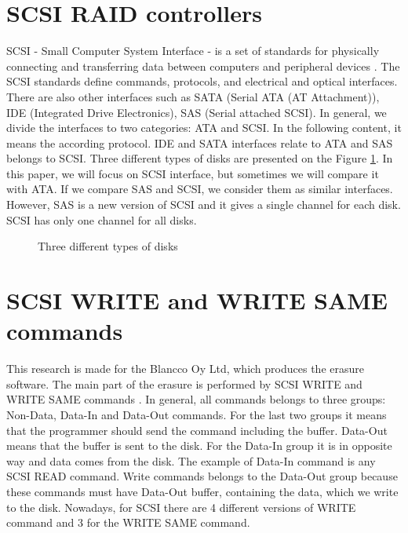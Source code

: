 \section{SCSI RAID controllers}
SCSI - Small Computer System Interface - is a set of standards for physically connecting and transferring data between computers and peripheral devices \cite{book_of_scsi}. The SCSI standards define commands, protocols, and electrical and optical interfaces. There are also other interfaces such as SATA (Serial ATA (AT Attachment)), IDE (Integrated Drive Electronics), SAS (Serial attached SCSI). In general, we divide the interfaces to two categories: ATA and SCSI. In the following content, it means the according protocol. IDE and SATA interfaces relate to ATA and SAS belongs to SCSI. Three different types of disks are presented on the Figure \ref{fig:disks}. In this paper, we will focus on SCSI interface, but sometimes we will compare it with ATA. If we compare SAS and SCSI, we consider them as similar interfaces. However, SAS is a new version of SCSI and it gives a single channel for each disk. SCSI has only one channel for all disks.
\begin{figure}[h]
  \advance{}\textwidth
  \caption{Three different types of disks}
  \label{fig:disks}
\end{figure}

\section{SCSI WRITE and WRITE SAME commands}
\label{subsec:write_comm}
This research is made for the Blancco Oy Ltd, which produces the erasure software. The main part of the erasure is performed by SCSI WRITE and WRITE SAME commands \cite{scsi3_bc}. In general, all commands belongs to three groups: Non-Data, Data-In and Data-Out commands. For the last two groups it means that the programmer should send the command including the buffer. Data-Out means that the buffer is sent to the disk. For the Data-In group it is in opposite way and data comes from the disk. The example of Data-In command is any SCSI READ command. Write commands belongs to the Data-Out group because these commands must have Data-Out buffer, containing the data, which we write to the disk. Nowadays, for SCSI there are 4 different versions of WRITE command and 3 for the WRITE SAME command.  

